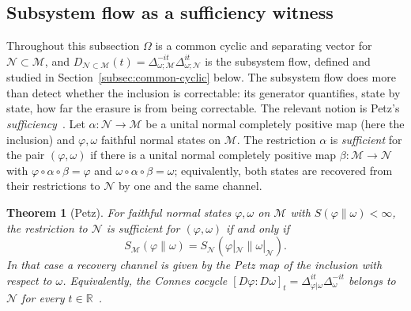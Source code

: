 \documentclass[a4paper,11pt]{article}
\newtheorem{theorem}{Theorem}
\theoremstyle{definition}
\newcommand{\mN}{\mathcal{N}}
\newcommand{\mM}{\mathcal{M}}
\begin{document}



\subsection{Subsystem flow as a sufficiency witness}\label{subsec:QEC-sufficiency}

Throughout this subsection $\Omega$ is a common cyclic and separating vector for $\mN\subset\mM$, and $D_{\mN\subset\mM}(t)=\Delta_{\omega;\mM}^{-it}\Delta_{\omega;\mN}^{it}$ is the subsystem flow, defined and studied in Section~\ref{subsec:common-cyclic} below. The subsystem flow does more than detect whether the inclusion is correctable: its generator quantifies, state by state, how far the erasure is from being correctable. The relevant notion is Petz's \emph{sufficiency}~\cite{Petz1986,Petz1988,OhyaPetz1993}. Let $\alpha:\mN\to\mM$ be a unital normal completely positive map (here the inclusion) and $\varphi,\omega$ faithful normal states on $\mM$. The restriction $\alpha$ is \emph{sufficient} for the pair $(\varphi,\omega)$ if there is a unital normal completely positive map $\beta:\mM\to\mN$ with $\varphi\circ\alpha\circ\beta=\varphi$ and $\omega\circ\alpha\circ\beta=\omega$; equivalently, both states are recovered from their restrictions to $\mN$ by one and the same channel.

\begin{theorem}[Petz]\label{thm:Petz}
For faithful normal states $\varphi,\omega$ on $\mM$ with $S(\varphi\|\omega)<\infty$, the restriction to $\mN$ is sufficient for $(\varphi,\omega)$ if and only if
\[
 S_{\mM}(\varphi\|\omega)=S_{\mN}(\varphi|_{\mN}\|\omega|_{\mN}) .
\]
In that case a recovery channel is given by the Petz map of the inclusion with respect to $\omega$. Equivalently, the Connes cocycle $[D\varphi:D\omega]_t=\Delta_{\varphi|\omega}^{it}\Delta_{\omega}^{-it}$ belongs to $\mN$ for every $t\in\mathbb R$~\cite{Petz1988,JencovaPetz2006}.
\end{theorem}
\end{document}
